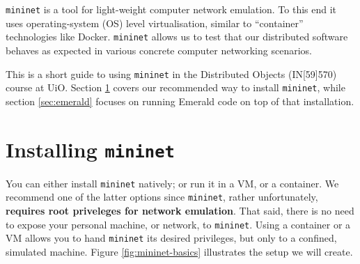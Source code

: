 \documentclass{article}
\newcommand{\mininet}{\texttt{mininet}}
\begin{document}
\maketitle

\mininet{} is a tool for light-weight computer network emulation. To
this end it uses operating-system (OS) level virtualisation, similar
to ``container'' technologies like Docker. \mininet{} allows us to
test that our distributed software behaves as expected in various
concrete computer networking scenarios.

This is a short guide to using \mininet{} in the Distributed Objects
(IN[59]570) course at UiO. Section \ref{sec:mininet} covers our
recommended way to install \mininet{}, while section \ref{sec:emerald}
focuses on running Emerald code on top of that installation.

\section{Installing \mininet{}}

\label{sec:mininet}

You can either install \mininet{} natively; or run it in a VM, or a
container. We recommend one of the latter options since \mininet{},
rather unfortunately, \textbf{requires root priveleges for network
emulation}. That said, there is no need to expose your personal
machine, or network, to \mininet{}. Using a container or a VM allows
you to hand \mininet{} its desired privileges, but only to a confined,
simulated machine. Figure \ref{fig:mininet-basics} illustrates the
setup we will create.
\end{document}
